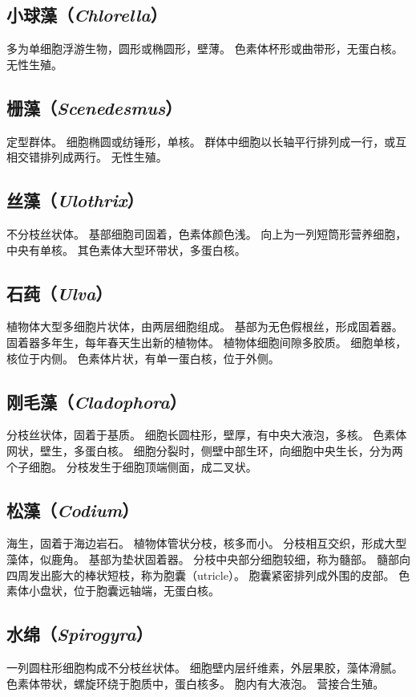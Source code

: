 \documentclass[11pt]{article}
\begin{document}
\subsection{小球藻（\textit{Chlorella}）}
多为单细胞浮游生物，圆形或椭圆形，壁薄。
色素体杯形或曲带形，无蛋白核。
无性生殖。

\subsection{栅藻（\textit{Scenedesmus}）}
定型群体。
细胞椭圆或纺锤形，单核。
群体中细胞以长轴平行排列成一行，或互相交错排列成两行。
无性生殖。

\subsection{丝藻（\textit{Ulothrix}）}
不分枝丝状体。
基部细胞司固着，色素体颜色浅。
向上为一列短筒形营养细胞，中央有单核。
其色素体大型环带状，多蛋白核。

\subsection{石莼（\textit{Ulva}）}
植物体大型多细胞片状体，由两层细胞组成。
基部为无色假根丝，形成固着器。
固着器多年生，每年春天生出新的植物体。
植物体细胞间隙多胶质。
细胞单核，核位于内侧。
色素体片状，有单一蛋白核，位于外侧。

\subsection{刚毛藻（\textit{Cladophora}）}
分枝丝状体，固着于基质。
细胞长圆柱形，壁厚，有中央大液泡，多核。
色素体网状，壁生，多蛋白核。
细胞分裂时，侧壁中部生环，向细胞中央生长，分为两个子细胞。
分枝发生于细胞顶端侧面，成二叉状。

\subsection{松藻（\textit{Codium}）}
海生，固着于海边岩石。
植物体管状分枝，核多而小。
分枝相互交织，形成大型藻体，似鹿角。
基部为垫状固着器。
分枝中央部分细胞较细，称为髓部。
髓部向四周发出膨大的棒状短枝，称为胞囊（utricle）。
胞囊紧密排列成外围的皮部。
色素体小盘状，位于胞囊远轴端，无蛋白核。

\subsection{水绵（\textit{Spirogyra}）}
一列圆柱形细胞构成不分枝丝状体。
细胞壁内层纤维素，外层果胶，藻体滑腻。
色素体带状，螺旋环绕于胞质中，蛋白核多。
胞内有大液泡。
营接合生殖。
\end{document}
